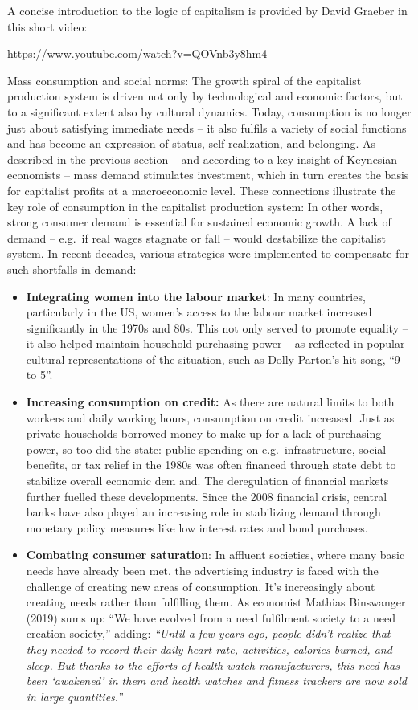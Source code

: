 \documentclass[
  a4paper,
  openany]{book}
\begin{document}
A concise introduction to the logic of capitalism is provided by David
Graeber in this short video:

\url{https://www.youtube.com/watch?v=QOVnb3y8hm4}

Mass consumption and social norms: The growth spiral of the capitalist
production system is driven not only by technological and economic
factors, but to a significant extent also by cultural dynamics. Today,
consumption is no longer just about satisfying immediate needs -- it
also fulfils a variety of social functions and has become an expression
of status, self-realization, and belonging. As described in the previous
section -- and according to a key insight of Keynesian economists --
mass demand stimulates investment, which in turn creates the basis for
capitalist profits at a macroeconomic level. These connections
illustrate the key role of consumption in the capitalist production
system: In other words, strong consumer demand is essential for
sustained economic growth. A lack of demand -- e.g.~if real wages
stagnate or fall -- would destabilize the capitalist system. In recent
decades, various strategies were implemented to compensate for such
shortfalls in demand:

\begin{itemize}
\item
  \textbf{Integrating women into the labour market}: In many countries,
  particularly in the US, women's access to the labour market increased
  significantly in the 1970s and 80s. This not only served to promote
  equality -- it also helped maintain household purchasing power -- as
  reflected in popular cultural representations of the situation, such
  as Dolly Parton's hit song, ``9 to 5''.
\item
  \textbf{Increasing consumption on credit:} As there are natural limits
  to both workers and daily working hours, consumption on credit
  increased. Just as private households borrowed money to make up for a
  lack of purchasing power, so too did the state: public spending on
  e.g.~infrastructure, social benefits, or tax relief in the 1980s was
  often financed through state debt to stabilize overall economic dem
  and. The deregulation of financial markets further fuelled these
  developments. Since the 2008 financial crisis, central banks have also
  played an increasing role in stabilizing demand through monetary
  policy measures like low interest rates and bond purchases.
\item
  \textbf{Combating consumer saturation}: In affluent societies, where
  many basic needs have already been met, the advertising industry is
  faced with the challenge of creating new areas of consumption. It's
  increasingly about creating needs rather than fulfilling them. As
  economist Mathias Binswanger (2019) sums up: ``We have evolved from a
  need fulfilment society to a need creation society,'' adding:
  \emph{``Until a few years ago, people didn't realize that they needed
  to record their daily heart rate, activities, calories burned, and
  sleep. But thanks to the efforts of health watch manufacturers, this
  need has been `awakened' in them and health watches and fitness
  trackers are now sold in large quantities.''}
\end{itemize}
\end{document}
